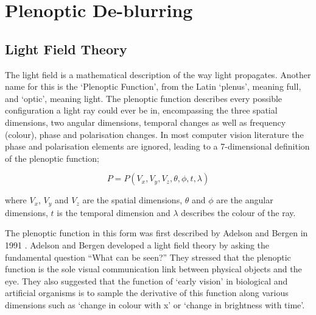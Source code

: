 
\chapter{Plenoptic De-blurring}
\label{chap:plenoptic_deblurring}

\section{Light Field Theory}
\label{sec:light_field_theory}



The light field is a mathematical description of the way light propagates.
Another name for this is the \enquote*{Plenoptic Function}, from the Latin \enquote*{plenus}, meaning full, and \enquote*{optic}, meaning light.
The plenoptic function describes every possible configuration a light ray could ever be in, encompassing the three spatial dimensions, two angular dimensions, temporal changes as well as frequency (colour), phase and polarisation changes.
In most computer vision literature the phase and polarisation elements are ignored, leading to a 7-dimensional definition of the plenoptic function;

\begin{equation}
\label{eq:plenoptic_function}
P = P(V_x, V_y, V_z, \theta, \phi, t, \lambda)
\end{equation}

where $V_x$, $V_y$ and $V_z$ are the spatial dimensions, $\theta$ and $\phi$ are the angular dimensions, $t$ is the temporal dimension and $\lambda$ describes the colour of the ray. 

The plenoptic function in this form was first described by Adelson and Bergen in 1991 \cite{adelson1991plenoptic}.
Adelson and Bergen developed a light field theory by asking the fundamental question \enquote{What can be seen?} They stressed that the plenoptic function is the sole visual communication link between physical objects and the eye.
They also suggested that the function of \enquote*{early vision} in biological and artificial organisms is to sample the derivative of this function along various dimensions such as \enquote*{change in colour with x} or \enquote*{change in brightness with time}.

